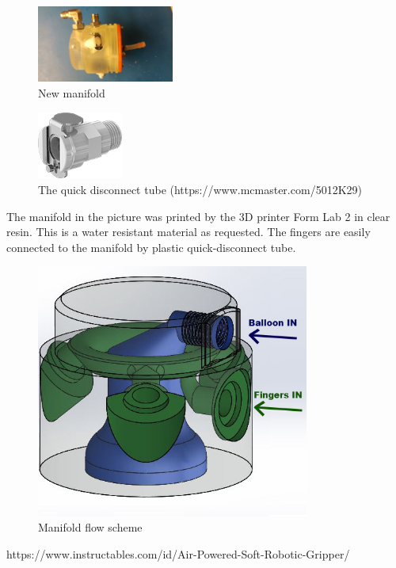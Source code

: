 \documentclass{article}
\begin{document}
\begin{figure}[h]
    \centering
    \includegraphics[width=0.4\textwidth]{Pictures/fingerOnToroidal/NewManifold.jpg}
    \caption{New manifold}
    \label{fig:newManifold}
\end{figure}

\begin{figure}[h]
    \centering
    \includegraphics[width=0.25\textwidth]{Pictures/fingerOnToroidal/Plastic_quick_disconnect_tube.png}
    \caption{The quick disconnect tube (https://www.mcmaster.com/5012K29)}
    \label{fig:quickDisconnector}
\end{figure}

The manifold in the picture was printed by the 3D printer Form Lab 2 in clear resin. This is a water resistant material as requested.
The fingers are easily connected to the manifold by plastic quick-disconnect tube.

\begin{figure}[h]
    \centering
    \includegraphics[width=0.8\textwidth]{Pictures/fingerOnToroidal/ManifoldSchemeFlowPhotoshop.jpg}
    \caption{Manifold flow scheme} 
    \label{fig:flowSchemeManifold}
\end{figure}




\begin{thebibliography}
 https://www.instructables.com/id/Air-Powered-Soft-Robotic-Gripper/
\end{thebibliography}
\end{document}
